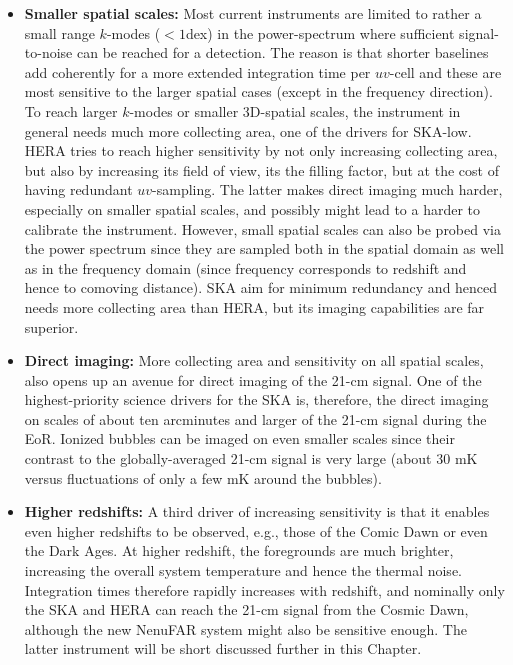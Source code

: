 \begin{itemize}
  
\item {\bf Smaller spatial scales:} Most current instruments are limited to rather a small range $k$-modes ($<1$dex) in the power-spectrum where sufficient signal-to-noise can be reached for a detection. The reason is that shorter baselines add coherently for a more extended integration time per $uv$-cell and these are most sensitive to the larger spatial cases (except in the frequency direction). To reach larger $k$-modes or smaller 3D-spatial scales, the instrument in general needs much more collecting area, one of the drivers for SKA-low. HERA tries to reach higher sensitivity by not only increasing collecting area, but also by increasing its field of view, its the filling factor, but at the cost of having redundant $uv$-sampling. The latter makes direct imaging much harder, especially on smaller spatial scales, and possibly might lead to a harder to calibrate the instrument. However, small spatial scales can also be probed via the power spectrum since they are sampled both in the spatial domain as well as in the frequency domain (since frequency corresponds to redshift and hence to comoving distance). SKA aim for minimum redundancy and henced needs 
more collecting area than HERA, but its imaging capabilities are far superior.
    
\item {\bf Direct imaging:} More collecting area and sensitivity on all spatial scales, also opens up an avenue for direct imaging of the 21-cm signal. One of the highest-priority science drivers for the SKA is, therefore, the direct imaging on scales of about ten arcminutes and larger of the 21-cm signal during the EoR. Ionized bubbles can be imaged on even smaller scales since their contrast to the globally-averaged 21-cm signal is very large (about 30 mK versus fluctuations of only a few mK around the bubbles). 

 \item {\bf Higher redshifts:} A third driver of increasing sensitivity is that it enables even higher redshifts to be observed, e.g., those of the Comic Dawn or even the Dark Ages. At higher redshift, the foregrounds are much brighter, increasing the overall system temperature and hence the thermal noise. Integration times therefore rapidly increases with redshift, and nominally only the SKA and HERA can reach the 21-cm signal from the Cosmic Dawn, although the new NenuFAR system might also be sensitive enough. The latter instrument will be short discussed further in this Chapter.
\end{itemize}

